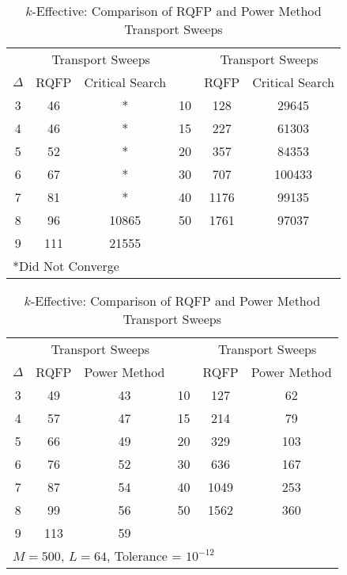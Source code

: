 \begin{table}[!htbp]
	\caption{Transport Sweep Comparisons for Homogeneous Multiplying Spheres}
	\begin{subtable}[!htbp]{1.0\textwidth}
	\centering{}
	\begin{tabular}{@{}cccccc@{}}\toprule
	& \multicolumn{2}{c}{Transport Sweeps} & & \multicolumn{2}{c}{Transport Sweeps} \\
	\cmidrule{2-3} \cmidrule{5-6} $\Delta$ & RQFP & Critical Search \quad &  \Delta & RQFP & Critical Search\\
	\midrule
3 & 46 & * & 10 & 128 & 29645 \\
4 & 46 & * & 15 & 227 & 61303 \\
5 & 52 & * & 20 & 357 & 84353 \\
6 & 67 & * & 30 & 707 & 100433 \\
7 & 81 & * & 40 & 1176 & 99135 \\
8 & 96 & 10865 & 50 & 1761 & 97037 \\
9 & 111 & 21555 & & & \\ 
	\bottomrule
	\multicolumn{6}{l}{*Did Not Converge} \\
	\end{tabular}
	\caption{Alpha-Eigenvalue: Comparison of RQFP and Critical Search Sweeps}
	\label{table:CompMultSweepsSphere}
	\end{subtable}%
	\vspace{0.25cm}
	\begin{subtable}[!htbp]{1.0\textwidth}
	\centering{}
	\begin{tabular}{@{}cccccc@{}}\toprule
	& \multicolumn{2}{c}{Transport Sweeps} & & \multicolumn{2}{c}{Transport Sweeps} \\
	\cmidrule{2-3} \cmidrule{5-6} $\Delta$ & RQFP & Power Method \quad &  \Delta & RQFP & Power Method\\
	\midrule
3 & 49 & 43 & 10 & 127 & 62 \\ 
4 & 57 & 47 & 15 & 214 & 79 \\
5 & 66 & 49 & 20 & 329 & 103 \\
6 & 76 & 52 & 30 & 636 & 167 \\ 
7 & 87 & 54 & 40 & 1049 & 253 \\ 
8 & 99 & 56 & 50 & 1562 & 360 \\ 
9 & 113 & 59 &  &  &  \\ 
	\bottomrule
	\multicolumn{6}{l}{$M = 500$, $L = 64$, Tolerance = $10^{-12}$} \\
	\end{tabular}
	\caption{$k$-Effective: Comparison of RQFP and Power Method Transport Sweeps}
	\label{table:CompMultSweepsKSphere}
	\end{subtable}
\end{table}

